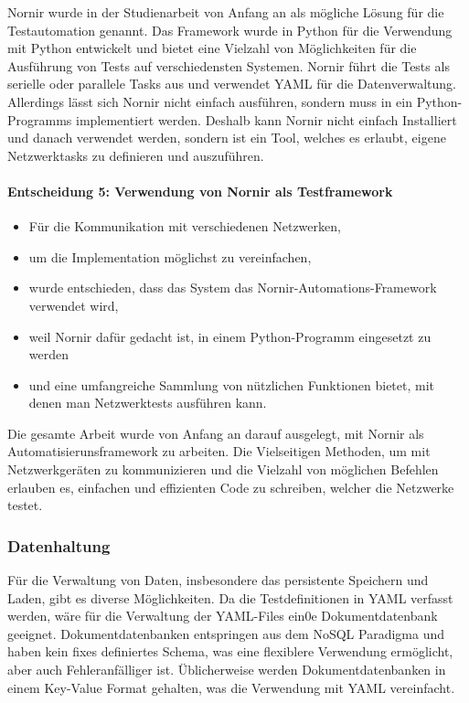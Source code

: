 \documentclass[
	ngerman,
	toc=listof, %
	toc=bibliography, %
	footnotes=multiple, %
	parskip=half, %
	numbers=noendperiod %
]{scrartcl}
\begin{document}
		Nornir wurde in der Studienarbeit von Anfang an als mögliche Lösung für die Testautomation genannt.
		Das Framework wurde in Python für die Verwendung mit Python entwickelt und bietet eine Vielzahl von Möglichkeiten für die Ausführung von Tests auf verschiedensten Systemen.
		Nornir führt die Tests als serielle oder parallele Tasks aus und verwendet YAML für die Datenverwaltung.
		Allerdings lässt sich Nornir nicht einfach ausführen, sondern muss in ein Python-Programms implementiert werden.
		Deshalb kann Nornir nicht einfach Installiert und danach verwendet werden, sondern ist ein Tool, welches es erlaubt, eigene Netzwerktasks zu definieren und auszuführen.



		\paragraph{Entscheidung 5: Verwendung von Nornir als Testframework}
		\begin{itemize}
			\item Für die Kommunikation mit verschiedenen Netzwerken,
			\item um die Implementation möglichst zu vereinfachen,
			\item wurde entschieden, dass das System das Nornir-Automations-Framework verwendet wird,
			\item weil Nornir dafür gedacht ist, in einem Python-Programm eingesetzt zu werden
			\item und eine umfangreiche Sammlung von nützlichen Funktionen bietet, mit denen man Netzwerktests ausführen kann.
		\end{itemize}

		Die gesamte Arbeit wurde von Anfang an darauf ausgelegt, mit Nornir als Automatisierunsframework zu arbeiten.
		Die Vielseitigen Methoden, um mit Netzwerkgeräten zu kommunizieren und die Vielzahl von möglichen Befehlen erlauben es, einfachen und effizienten Code zu schreiben, welcher die Netzwerke testet.
		\newpage

		\subsubsection{Datenhaltung}
		Für die Verwaltung von Daten, insbesondere das persistente Speichern und Laden, gibt es diverse Möglichkeiten.
		Da die Testdefinitionen in YAML verfasst werden, wäre für die Verwaltung der YAML-Files ein0e Dokumentdatenbank geeignet.
		Dokumentdatenbanken entspringen aus dem NoSQL Paradigma und haben kein fixes definiertes Schema, was eine flexiblere Verwendung ermöglicht, aber auch Fehleranfälliger ist.
		Üblicherweise werden Dokumentdatenbanken in einem Key-Value Format gehalten, was die Verwendung mit YAML vereinfacht.
\end{document}
